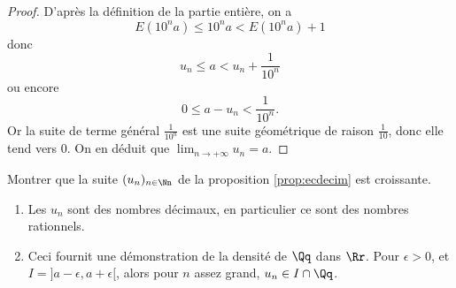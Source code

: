 \documentclass[class=report,crop=false]{standalone}
\begin{document}
\begin{proof}
  D'après la définition de la partie entière, on a
  \[E(10^na)\leq 10^na < E(10^na)+1\]
donc
\[ u_n \leq a < u_n+\frac{1}{10^n} \]
ou encore
\[ 0 \leq a -u_n< \frac{1}{10^n} .\]
Or la suite de terme général $\frac{1}{10^n}$ est une suite géométrique de raison
$\frac{1}{10}$, donc elle tend vers $0$. On en déduit que $\lim_{n\to +\infty} u_n=a$.

\end{proof}

\begin{exercicecours}
  Montrer que la suite $(u_n)_{n\in \Nn}$ de la proposition \ref{prop:ecdecim} est croissante.
\end{exercicecours}

\begin{remarque*}
\sauteligne
  \begin{enumerate}
    \item Les $u_n$ sont des nombres décimaux, en particulier ce sont des nombres rationnels.
    \item Ceci fournit une démonstration de la densité de $\Qq$ dans $\Rr$.
Pour $\epsilon >0$, et $I=]a-\epsilon,a+\epsilon[$, alors pour $n$ assez grand, $u_n\in I\cap \Qq$.
  \end{enumerate}
\end{remarque*}


\end{document}
